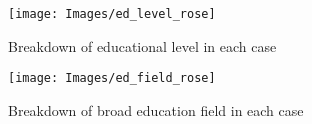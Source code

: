 \begin{figure}
	\centering
	\texttt{[image: Images/ed\_level\_rose]}
	\caption{Breakdown of educational level in each case}
	\label{fig:edlevelrose}
\end{figure}

\begin{figure}
	\centering
	\texttt{[image: Images/ed\_field\_rose]}
	\caption{Breakdown of broad education field in each case}
	\label{fig:edfieldrose}
\end{figure}